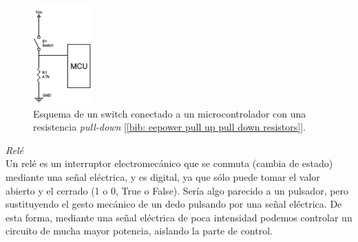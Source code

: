 \documentclass[12pt]{article}
\begin{document}
	\pagebreak
	
	\begin{figure}[h]
		\begin{center}
			\includegraphics[width=0.2\textwidth]{img/pull-down-resistor.png}
			\caption{Esquema de un switch conectado a un microcontrolador con una resistencia \textit{pull-down} [\ref{bib: eepower pull up pull down resistors}].}
			\label{Esquema resistencia pull-down}
		\end{center}
	\end{figure}

	\noindent \textit{Relé} \\
	
	\noindent Un relé es un interruptor electromecánico que se conmuta (cambia de estado) mediante una señal eléctrica, y es digital, ya que sólo puede tomar el valor abierto y el cerrado (1 o 0, True o False). Sería algo parecido a un pulsador, pero sustituyendo el gesto mecánico de un dedo pulsando por una señal eléctrica. De esta forma, mediante una señal eléctrica de poca intensidad podemos controlar un circuito de mucha mayor potencia, aislando la parte de control. 
	
	
\end{document}
